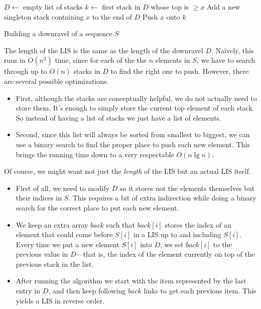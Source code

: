 \documentclass[10pt]{book}
\newif\iftodos
\newcommand{\todo}[1]{\iftodos\textcolor{red}{[TODO: #1]}\fi}
\begin{document}
\begin{center}
  \begin{minipage}{0.8\textwidth}
    \begin{algorithm}[H]
      \begin{algorithmic}[1]
        \State $D \gets$ empty list of stacks
          \State $k \gets$ first stack in $D$ whose top is $\geq x$
            \State Add a new singleton stack containing $x$ to the end
            of $D$
          \Else
            \State Push $x$ onto $k$
          \EndIf
          \EndFor
        \State {}
        \EndFunction
      \end{algorithmic}
      \caption{Building a downravel of a sequence $S$}
      \label{alg:downravel}
    \end{algorithm}
  \end{minipage}
\end{center}

\todo{add some pictures?}

The length of the LIS is the same as the length of the downravel $D$.
Na\"ively, this runs in $O(n^2)$ time, since for each of the the $n$
elements in $S$, we have to search through up to $O(n)$ stacks in $D$
to find the right one to push.  However, there are several possible
optimizations.

\begin{itemize}
\item First, although the stacks are conceptually helpful, we do not
  actually need to store them. It's enough to simply store the current
  top element of each stack.  So instead of having a list of stacks we
  just have a list of elements.
\item Second, since this list will always be sorted from smallest to
  biggest, we can use a binary search to find the proper place to push
  each new element.  This brings the running time down to a very
  respectable $O(n \lg n)$.
\end{itemize}

Of course, we might want not just the \emph{length} of the LIS but an
actual LIS itself.

\begin{itemize}
\item First of all, we need to modify $D$ so it stores not the elements
  themselves but their indices in $S$.  This requires a bit of extra
  indirection while doing a binary search for the correct place to put
  each new element.
\item We keep an extra array $\mathit{back}$ such that
  $\mathit{back}[i]$ stores the index of an element that could come
  before $S[i]$ in a LIS up to and including $S[i]$.  Every time we
  put a new element $S[i]$ into $D$, we set $\mathit{back[i]}$ to the
  previous value in $D$---that is, the index of the element currently
  on top of the previous stack in the list.
\item After running the algorithm we start with the item represented by
  the last entry in $D$, and then keep following $\mathit{back}$ links
  to get each previous item.  This yields a LIS in reverse order.
\end{itemize}
\end{document}
